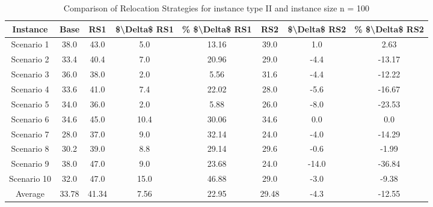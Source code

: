 \begin{table}[H]
\centering
\begin{tabular}{cccccccc}
  \hline
  \textbf{Instance} & \textbf{Base} & \textbf{RS1} & \textbf{\$\textbackslash{}Delta\$  RS1} & \textbf{\% \$\textbackslash{}Delta\$  RS1} & \textbf{RS2} & \textbf{\$\textbackslash{}Delta\$  RS2} & \textbf{\% \$\textbackslash{}Delta\$  RS2} \\\hline
  Scenario 1 & 38.0 & 43.0 & 5.0 & 13.16 & 39.0 & 1.0 & 2.63 \\
  Scenario 2 & 33.4 & 40.4 & 7.0 & 20.96 & 29.0 & -4.4 & -13.17 \\
  Scenario 3 & 36.0 & 38.0 & 2.0 & 5.56 & 31.6 & -4.4 & -12.22 \\
  Scenario 4 & 33.6 & 41.0 & 7.4 & 22.02 & 28.0 & -5.6 & -16.67 \\
  Scenario 5 & 34.0 & 36.0 & 2.0 & 5.88 & 26.0 & -8.0 & -23.53 \\
  Scenario 6 & 34.6 & 45.0 & 10.4 & 30.06 & 34.6 & 0.0 & 0.0 \\
  Scenario 7 & 28.0 & 37.0 & 9.0 & 32.14 & 24.0 & -4.0 & -14.29 \\
  Scenario 8 & 30.2 & 39.0 & 8.8 & 29.14 & 29.6 & -0.6 & -1.99 \\
  Scenario 9 & 38.0 & 47.0 & 9.0 & 23.68 & 24.0 & -14.0 & -36.84 \\
  Scenario 10 & 32.0 & 47.0 & 15.0 & 46.88 & 29.0 & -3.0 & -9.38 \\
  Average & 33.78 & 41.34 & 7.56 & 22.95 & 29.48 & -4.3 & -12.55 \\\hline
\end{tabular}
\caption{Comparison of Relocation Strategies for instance type II and instance size n = 100}
\label{tab:wait:resrelocation-comparison_II_100}
\end{table}
